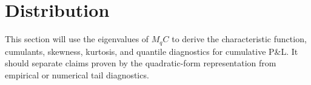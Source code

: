 \section{Distribution}

This section will use the eigenvalues of \(M_q C\) to derive the characteristic function, cumulants, skewness, kurtosis, and quantile diagnostics for cumulative P\&L. It should separate claims proven by the quadratic-form representation from empirical or numerical tail diagnostics.
